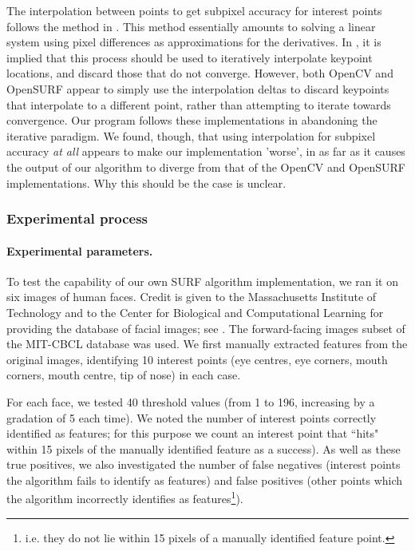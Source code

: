 The interpolation between points to get subpixel accuracy for interest points follows the method in \cite{inv-features}. This method essentially amounts to solving a linear system using pixel differences as approximations for the derivatives. In \cite{SURF}, it is implied that this process should be used to iteratively interpolate keypoint locations, and discard those that do not converge. However, both OpenCV and OpenSURF appear to simply use the interpolation deltas to discard keypoints that interpolate to a different point, rather than attempting to iterate towards convergence. Our program follows these implementations in abandoning the iterative paradigm. We found, though, that using interpolation for subpixel accuracy \emph{at all} appears to make our implementation 'worse', in as far as it causes the output of our algorithm to diverge from that of the OpenCV and OpenSURF implementations. Why this should be the case is unclear.

\subsubsection{Experimental process}

\paragraph{Experimental parameters.}
To test the capability of our own SURF algorithm implementation, we ran it on six images of human faces. Credit is given to the Massachusetts Institute of Technology and to the Center for Biological and Computational Learning for providing the database of facial images; see \cite{database}. The forward-facing images subset of the MIT-CBCL database was used. We first manually extracted features from the original images, identifying 10 interest points (eye centres, eye corners, mouth corners, mouth centre, tip of nose) in each case.

For each face, we tested 40 threshold values (from 1 to 196, increasing by a gradation of 5 each time). We noted the number of interest points correctly identified as features; for this purpose we count an interest point that ``hits" within 15 pixels of the manually identified feature as a success). As well as these true positives, we also investigated the number of false negatives (interest points the algorithm fails to identify as features) and false positives (other points which the algorithm incorrectly identifies as features\footnote{i.e. they do not lie within 15 pixels of a manually identified feature point.}).

